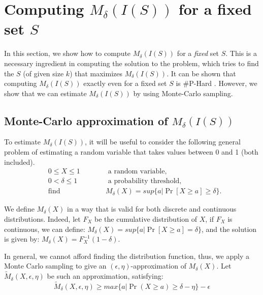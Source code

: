 \section{Computing $M_{\delta}(I(S))$ for a fixed set $S$}
\label{sec:sampling}

In this section, we show how to compute $M_{\delta}(I(S))$ for a {\em fixed} set $S$. This is a necessary ingredient in computing the solution to the \infprob{} problem, which
tries to find the $S$ (of given size $k$) that maximizes $M_{\delta}(I(S))$.  It can be shown  that computing $M_{\delta}(I(S))$ exactly even for a fixed set $S$ is \#P-Hard \cite{zhang:kdd14}. However, we show  that we can estimate  $M_{\delta}(I(S))$ by using Monte-Carlo sampling.
\subsection{Monte-Carlo approximation of $M_{\delta}(I(S))$}
To estimate $M_{\delta}(I(S))$, it will be useful to consider the following general problem of estimating
a random variable that takes values between 0 and 1 (both included). 
\begin{equation}
\begin{alignedat}{2}
  & 0 \leq X \leq 1 && \text{ a random variable} ,\\
  & 0 < \delta \leq 1 && \text{ a probability threshold} ,\\
  & \text{find} & \qquad & M_{\delta}(X) = sup\{a | \Pr[X \geq a] \geq \delta \}.
\end{alignedat}
\end{equation}

We  define $M_{\delta}(X)$  in a way that is valid for
both discrete and continuous distributions. Indeed, let $F_{X}$ be the cumulative distribution of
$X$, if $F_X$ is continuous, we can define: $M_{\delta}(X) = sup\{a | \Pr[X \geq a] = \delta \}$,
and the solution is given by: $M_{\delta}(X) = F^{-1}_X(1 - \delta)$.

In general, we cannot afford finding the distribution function, thus, we apply a Monte Carlo
sampling to give an $(\epsilon, \eta)$-approximation of $M_{\delta}(X)$.
Let $\widetilde{M}_{\delta}(X, \epsilon, \eta)$ be such an approximation, satisfying:
\begin{equation}
\label{eq:numr-mdelta}
  \widetilde M_{\delta}(X, \epsilon, \eta) \geq max \{ a | \Pr(X \geq a) \geq \delta
    - \eta \} - \epsilon
\end{equation}

